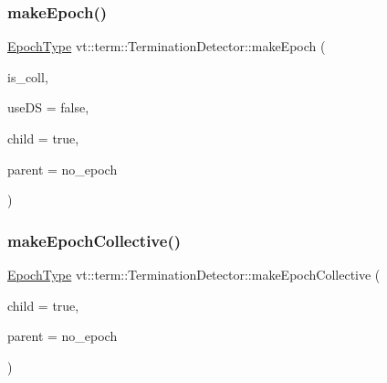 \subsubsection{\texorpdfstring{make\+Epoch()}{makeEpoch()}}
{\footnotesize\ttfamily \hyperlink{namespacevt_a985a5adf291c34a3ca263b3378388236}{Epoch\+Type} vt\+::term\+::\+Termination\+Detector\+::make\+Epoch (\begin{DoxyParamCaption}\item[{bool}]{is\+\_\+coll,  }\item[{bool}]{use\+DS = {\ttfamily false},  }\item[{bool}]{child = {\ttfamily true},  }\item[{\hyperlink{namespacevt_a985a5adf291c34a3ca263b3378388236}{Epoch\+Type}}]{parent = {\ttfamily no\+\_\+epoch} }\end{DoxyParamCaption})}

\mbox{\label{structvt_1_1term_1_1_termination_detector_ab60c7f5ae946139a71f02443b120eeab}} 
\subsubsection{\texorpdfstring{make\+Epoch\+Collective()}{makeEpochCollective()}}
{\footnotesize\ttfamily \hyperlink{namespacevt_a985a5adf291c34a3ca263b3378388236}{Epoch\+Type} vt\+::term\+::\+Termination\+Detector\+::make\+Epoch\+Collective (\begin{DoxyParamCaption}\item[{bool}]{child = {\ttfamily true},  }\item[{\hyperlink{namespacevt_a985a5adf291c34a3ca263b3378388236}{Epoch\+Type}}]{parent = {\ttfamily no\+\_\+epoch} }\end{DoxyParamCaption})}

\mbox{\label{structvt_1_1term_1_1_termination_detector_af8072e5e5c2262c97040a5891d60df6e}} 
